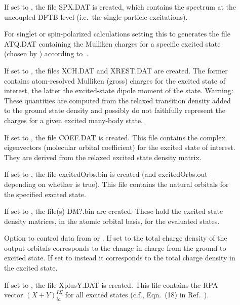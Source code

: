 \begin{description}
  \item[] If set to , the file SPX.DAT is
    created, which contains the spectrum at the uncoupled DFTB level (i.e.\ the
    single-particle excitations).

  \item[] For singlet or spin-polarized
    calculations setting this to  generates the file
    ATQ.DAT containing the Mulliken charges for a specific excited state (chosen by
    ) according to~\cite{plotz2014new}.

  \item[] If set to , the files XCH.DAT and XREST.DAT
    are created. The former contains atom-resolved Mulliken (gross) charges for
    the excited state of interest, the latter the excited-state dipole moment of
    the state. Warning: These quantities are computed from the relaxed
    transition density added to the ground state density and possibly do not
    faithfully represent the charges for a given excited many-body
    state.

  \item[] If set to , the file COEF.DAT is
    created. This file contains the complex eigenvectors (molecular orbital
    coefficient) for the excited state of interest. They are derived from the
    relaxed excited state density matrix.

  \item[] If set to , the file excitedOrbs.bin is
    created (and excitedOrbs.out depending on whether  is
    true). This file contains the natural orbitals for the specified excited
    state.

  \item[] If set to , the file(s) DM?.bin are
    created. These hold the excited state density matrices, in the atomic
    orbital basis, for the evaluated states.

  \item[] Option to control data from
     or . If set to  the
    total charge density of the output orbitals corresponds to the change in
    charge from the ground to excited state. If set to  instead it
    corresponds to the total charge density in the excited state.

  \item[] If set to , the file XplusY.DAT is
    created. This file contains the RPA vector $(X+Y)^{I\Sigma}_{ia}$ for all
    excited states (c.f., Eqn.~(18) in Ref.~\cite{heringer2007aes}).


\end{description}
